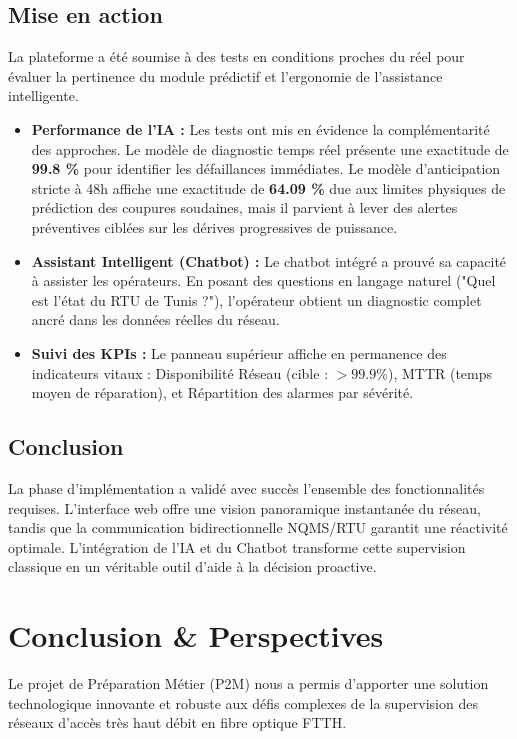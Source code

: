 \documentclass[11pt,a4paper]{article}
\begin{document}
\subsection{Mise en action}
La plateforme a été soumise à des tests en conditions proches du réel pour évaluer la pertinence du module prédictif et l'ergonomie de l'assistance intelligente.
\begin{itemize}
    \item \textbf{Performance de l'IA :} Les tests ont mis en évidence la complémentarité des approches. Le modèle de diagnostic temps réel présente une exactitude de \textbf{99.8 \%} pour identifier les défaillances immédiates. Le modèle d'anticipation stricte à 48h affiche une exactitude de \textbf{64.09 \%} due aux limites physiques de prédiction des coupures soudaines, mais il parvient à lever des alertes préventives ciblées sur les dérives progressives de puissance.
    \item \textbf{Assistant Intelligent (Chatbot) :} Le chatbot intégré a prouvé sa capacité à assister les opérateurs. En posant des questions en langage naturel ("Quel est l'état du RTU de Tunis ?"), l'opérateur obtient un diagnostic complet ancré dans les données réelles du réseau.
    \item \textbf{Suivi des KPIs :} Le panneau supérieur affiche en permanence des indicateurs vitaux : Disponibilité Réseau (cible : $> 99.9\%$), MTTR (temps moyen de réparation), et Répartition des alarmes par sévérité.
\end{itemize}

\subsection{Conclusion}
La phase d'implémentation a validé avec succès l'ensemble des fonctionnalités requises. L'interface web offre une vision panoramique instantanée du réseau, tandis que la communication bidirectionnelle NQMS/RTU garantit une réactivité optimale. L'intégration de l'IA et du Chatbot transforme cette supervision classique en un véritable outil d'aide à la décision proactive.

\newpage

\section{Conclusion \& Perspectives}
Le projet de Préparation Métier (P2M) nous a permis d'apporter une solution technologique innovante et robuste aux défis complexes de la supervision des réseaux d'accès très haut débit en fibre optique FTTH.
\end{document}
